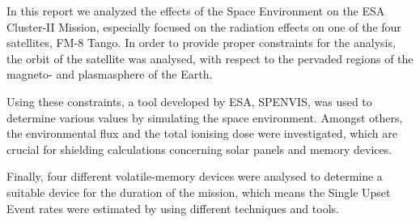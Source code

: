 \clearpage\thispagestyle{empty}\addtocounter{page}{-1} 
\abstract
In this report we analyzed the effects of the Space Environment on the ESA Cluster-II Mission, especially focused on the radiation effects on one of the four satellites, FM-8 Tango.
In order to provide proper constraints for the analysis, the orbit of the satellite was analysed, with respect to the pervaded regions of the magneto- and plasmasphere of the Earth.

Using these constraints, a tool developed by ESA, SPENVIS, was used to determine various values by simulating the space environment.
Amongst others, the environmental flux and the total ionising dose were investigated, which are crucial for shielding calculations concerning solar panels and memory devices.

Finally, four different volatile-memory devices were analysed to determine a suitable device for the duration of the mission, which means the Single Upset Event rates were estimated by using different techniques and tools.


